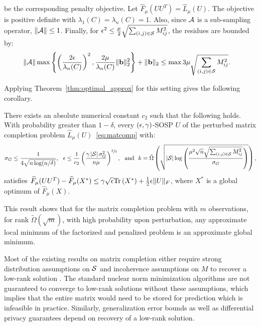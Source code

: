 be the corresponding penalty objective.  Let $\widehat F_{\mu}(UU^T) = \widehat L_{\mu} (U)$. The objective is positive definite with $\lambda_1(C)=\lambda_n(C)=1$. Also, since $\mathcal{A}$ is a sub-sampling operator, $\|\mathcal{A}\| \leq 1$. Finally, for $\epsilon^2 \leq \frac{\mu}{2}\sqrt{\sum_{(i,j) \in \mathcal{S}} M_{ij}^2}$, the residues are bounded by: \begin{align*} & \|\mathcal{A}\| \max \left \{ \left( \frac{2\epsilon} {\lambda_n(C)}\right)^2, \frac{2\mu}{\lambda_n(C)} \|\mathbf{b}\|_2^2 \right \}+\|\mathbf{b}\|_2 \leq \max  3\mu \sqrt{\sum_{(i,j) \in \mathcal{S}} M_{ij}^2}. \end{align*}


\noindent Applying Theorem~\ref{thm:optimal_approx} for this setting gives the following corollary.
\begin{corollary}\label{cor:mc_optimal}There exists an absolute numerical constant $c_2$ such that the following holds. With probability greater than $1-\delta$,
every $(\epsilon, \gamma)$-SOSP $U$ of the perturbed matrix completion problem $\widehat{L}_{\mu}(U)$~\eqref{eq:matcomp} with:
\begin{align*}\sigma_G \leq \frac{1}{4\sqrt{n \log(n/ \delta)}},~~ \epsilon \leq \frac{1}{c_2}\left(\frac{\gamma \left\lvert{\mathcal{S}}\right\rvert \sigma_G^2 }{ n  \mu }\right)^{\sfrac{2}{3}}, ~\text{ and }~ k = \tilde{\Omega} \left( \sqrt{ \left\lvert{\mathcal{S}}\right\rvert   \log\left(\frac{\mu^2 \sqrt{n} \sqrt{\sum_{(i,j) \in \mathcal{S}} M_{ij}^2}}{\sigma_G}\right) } \right),\end{align*} satisfies $\widehat{F}_{\mu}(UU^T)  - \widehat F_{\mu}(X^*)  \leq \gamma \sqrt{\epsilon} \mathrm{Tr}\left(X^*\right) + \frac{1}{2} \epsilon \|U\|_F$, where $X^*$ is a global optimum of $\widehat{F}_{\mu}(X)$.
\end{corollary}
\noindent This result shows that for the  matrix completion problem with $m$ observations, for rank $\tilde{\Omega}(\sqrt{m})$, with high probability upon perturbation, any approximate local minimum of the factorized and penalized problem is an approximate global minimum. 

Most of the existing results on matrix completion either require strong distribution assumptions on $\mathcal{S}$ and incoherence assumptions on $M$ to recover a low-rank solution \citep{candes2009exact, jain2013low}. The standard nuclear norm minimization algorithms are not guaranteed to converge to low-rank solutions without these assumptions,  which implies that the entire matrix would need to be stored for prediction which is infeasible in practice. Similarly,  generalization error bounds \citep{foygel2011concentration} as well as differential privacy guarantees  depend on recovery of a low-rank solution.

